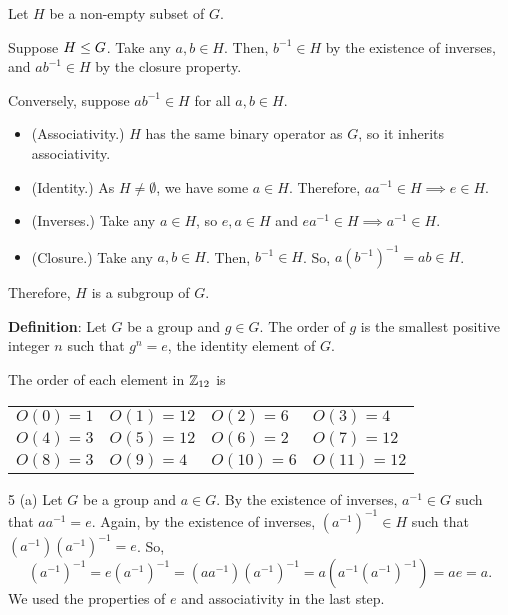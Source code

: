 \documentclass[11pt]{penrose}
\begin{document}
\begin{problem}{3}
    Let $H$ be a non-empty subset of $G$.

    Suppose $H \mathrel{\leq} G$. Take any $a, b \in H$. Then, $b^{-1} \in H$ by the existence of inverses, and $a b^{-1} \in H$ by the closure property.

    Conversely, suppose $a b^{-1} \in H$ for all $a, b \in H$.
    \begin{itemize}
        \item (Associativity.) $H$ has the same binary operator as $G$, so it inherits associativity.
        \item (Identity.) As $H \neq \emptyset$, we have some $a \in H$. Therefore, $a a^{-1} \in H \implies e \in H$.
        \item (Inverses.) Take any $a \in H$, so $e, a \in H$ and $e a^{-1} \in H \implies a^{-1} \in H$.
        \item (Closure.) Take any $a, b \in H$. Then, $b^{-1} \in H$. So, $a (b^{-1})^{-1} = ab \in H$.
    \end{itemize}
    Therefore, $H$ is a subgroup of $G$.
\end{problem}

\begin{problem}{4}
    \textbf{Definition}: Let $G$ be a group and $g \in G$. The order of $g$ is the smallest positive integer $n$ such that $g^n = e$, the identity element of $G$.

    The order of each element in $\mathbb{Z}_{12}$ is
    \begin{center}
    \begin{tabularx}{0.8\textwidth}{XXXX}
        $O(0)  =  1$ & $O(1)  = 12$ & $O(2)  =  6$ & $O(3)  =  4$\\
        $O(4)  =  3$ & $O(5)  = 12$ & $O(6)  =  2$ & $O(7)  = 12$\\
        $O(8)  =  3$ & $O(9)  =  4$ & $O(10) =  6$ & $O(11) = 12$\\
    \end{tabularx}
    \end{center}
\end{problem}

\begin{problem}{5 (a)}
    Let $G$ be a group and $a \in G$. By the existence of inverses, $a^{-1} \in G$ such that $a a^{-1} = e$. Again, by the existence of inverses, $(a^{-1})^{-1} \in H$ such that $(a^{-1}) (a^{-1})^{-1} = e$. So,
    \begin{equation*}
        (a^{-1})^{-1}
        = e (a^{-1})^{-1}
        = (a a^{-1}) (a^{-1})^{-1}
        = a (a^{-1} (a^{-1})^{-1})
        = a e = a.
    \end{equation*}
    We used the properties of $e$ and associativity in the last step.
\end{problem}
\end{document}
